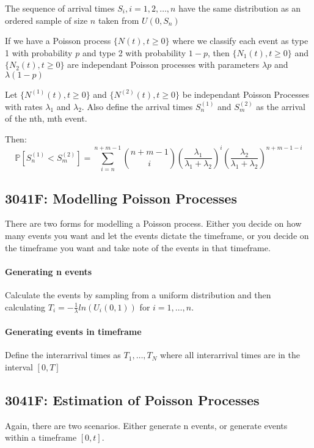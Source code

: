 \documentclass[12pt]{article}
\begin{document}
    The sequence of arrival times \({S_i, i=1, 2, \dots, n}\) have the same distribution as an ordered sample of size \(n\) taken from \(U(0, S_n)\)


    If we have a Poisson process \(\{N(t), t \ge 0\}\) where we classify each event as type 1
    with probability \(p\) and type 2 with probability \(1-p\), then 
    \(\{N_1(t), t \ge 0\}\) and \(\{N_2(t), t \ge 0\}\) are independant Poisson 
    processes with parameters \(\lambda p\) and \(\lambda (1-p)\)


    Let \(\{N^{(1)}(t), t \ge 0\}\) and \(\{N^{(2)}(t), t \ge 0\}\) be independant Poisson 
    Processes with rates \(\lambda_1\) and \(\lambda_2\).
    Also define the arrival times \(S^{(1)}_n\) and \(S^{(2)}_m\) as the arrival of the nth, mth event.

    Then:
    \begin{equation*}
        \mathbb{P}[S^{(1)}_n < S^{(2)}_m] = 
        \sum_{i=n}^{n + m - 1} 
        \binom{n + m - 1}{i} 
        \left( \frac{\lambda_1}{\lambda_1 + \lambda_2} \right)^i 
        \left( \frac{\lambda_2}{\lambda_1 + \lambda_2} \right)^{n + m - 1 - i}
    \end{equation*}
    \subsection{3041F: Modelling Poisson Processes}
    There are two forms for modelling a Poisson process. 
    Either you decide on how many events you want and let the events dictate the timeframe,
    or you decide on the timeframe you want and take note of the events in that timeframe.

    \paragraph{Generating n events} Calculate the events by sampling from a uniform distribution and then calculating \(T_i = -\frac{1}{\lambda} ln(U_i(0,  1))\) for \(i = 1, \dots, n\). 
    \paragraph{Generating events in timeframe} Define the interarrival times as \(T_1, \dots, 
    T_N\) where all interarrival times are in the interval \([0, T]\)
    \subsection{3041F: Estimation of Poisson Processes}
    Again, there are two scenarios. Either generate n events, or generate events within a timeframe \([0, t]\).
\end{document}

